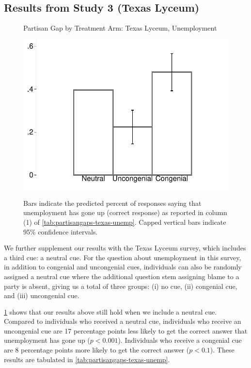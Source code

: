 \documentclass[12pt, letterpaper]{article}
\begin{document}
	\subsection*{Results from Study 3 (Texas Lyceum)}
	\begin{figure}[!t]
		\centering
		\caption{Partisan Gap by Treatment Arm: Texas Lyceum, Unemployment}
		\includegraphics[width=.55\textwidth]{../figs/texas-unemp-congenialcue.pdf}
		\label{fig:partisangaps-texas-unemp}
		\caption*{\footnotesize 
			Bars indicate the predicted percent of responses saying that unemployment has gone up (correct response) as reported in column (1) of \cref{tab:partisangaps-texas-unemp}.  
			Capped vertical bars indicate 95\% confidence intervals.
		}
	\end{figure}
	
	We further supplement our results with the Texas Lyceum survey, which includes a third cue: a neutral cue. For the question about unemployment in this survey, in addition to congenial and uncongenial cues, individuals can also be randomly assigned a neutral cue where the additional question stem assigning blame to a party is absent, giving us a total of three groups: (i) no cue, (ii) congenial cue, and (iii) uncongenial cue.
	
	\cref{fig:partisangaps-texas-unemp} shows that our results above still hold when we include a neutral cue. Compared to individuals who received a neutral cue, individuals who receive an uncongenial cue are 17 percentage points less likely to get the correct answer that unemployment has gone up ($p<0.001$). Individuals who receive a congenial cue are 8 percentage points more likely to get the correct answer ($p<0.1$). These results are tabulated in \cref{tab:partisangaps-texas-unemp}.
	
\end{document}
